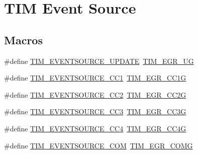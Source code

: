 \hypertarget{group___t_i_m___event___source}{}\section{T\+IM Event Source}
\label{group___t_i_m___event___source}
\subsection*{Macros}
\begin{DoxyCompactItemize}
\item 
\#define \mbox{\hyperlink{group___t_i_m___event___source_ga6b9d1352735d2ddbafcaa31ae05cd1ee}{T\+I\+M\+\_\+\+E\+V\+E\+N\+T\+S\+O\+U\+R\+C\+E\+\_\+\+U\+P\+D\+A\+TE}}~\mbox{\hyperlink{group___peripheral___registers___bits___definition_ga16f52a8e9aad153223405b965566ae91}{T\+I\+M\+\_\+\+E\+G\+R\+\_\+\+UG}}
\item 
\#define \mbox{\hyperlink{group___t_i_m___event___source_ga529eadf26cd17108dd95b9707a3d0f55}{T\+I\+M\+\_\+\+E\+V\+E\+N\+T\+S\+O\+U\+R\+C\+E\+\_\+\+C\+C1}}~\mbox{\hyperlink{group___peripheral___registers___bits___definition_ga0a1318609761df5de5213e9e75b5aa6a}{T\+I\+M\+\_\+\+E\+G\+R\+\_\+\+C\+C1G}}
\item 
\#define \mbox{\hyperlink{group___t_i_m___event___source_ga12e3a98c601f4f288354ac2538050e6b}{T\+I\+M\+\_\+\+E\+V\+E\+N\+T\+S\+O\+U\+R\+C\+E\+\_\+\+C\+C2}}~\mbox{\hyperlink{group___peripheral___registers___bits___definition_ga5423de00e86aeb8a4657a509af485055}{T\+I\+M\+\_\+\+E\+G\+R\+\_\+\+C\+C2G}}
\item 
\#define \mbox{\hyperlink{group___t_i_m___event___source_ga1c2faf942ab525b44299ddd0a6d848e4}{T\+I\+M\+\_\+\+E\+V\+E\+N\+T\+S\+O\+U\+R\+C\+E\+\_\+\+C\+C3}}~\mbox{\hyperlink{group___peripheral___registers___bits___definition_ga064d2030abccc099ded418fd81d6aa07}{T\+I\+M\+\_\+\+E\+G\+R\+\_\+\+C\+C3G}}
\item 
\#define \mbox{\hyperlink{group___t_i_m___event___source_ga157e43c99e6a1c0097b184cc842b5dfb}{T\+I\+M\+\_\+\+E\+V\+E\+N\+T\+S\+O\+U\+R\+C\+E\+\_\+\+C\+C4}}~\mbox{\hyperlink{group___peripheral___registers___bits___definition_ga1c4e5555dd3be8ab1e631d1053f4a305}{T\+I\+M\+\_\+\+E\+G\+R\+\_\+\+C\+C4G}}
\item 
\#define \mbox{\hyperlink{group___t_i_m___event___source_ga5724ce4aaf842a2166edaaff1531c1d1}{T\+I\+M\+\_\+\+E\+V\+E\+N\+T\+S\+O\+U\+R\+C\+E\+\_\+\+C\+OM}}~\mbox{\hyperlink{group___peripheral___registers___bits___definition_gadb06f8bb364307695c7d6a028391de7b}{T\+I\+M\+\_\+\+E\+G\+R\+\_\+\+C\+O\+MG}}

\end{DoxyCompactItemize}
